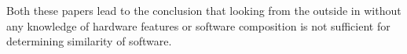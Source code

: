 \documentclass[../bachelor_paper.tex]{subfiles}
\begin{document}
Both these papers lead to the conclusion that looking from the outside in without any knowledge of hardware features or software composition is not sufficient for determining similarity of software.


\isstandalone



\fi
\end{document}
